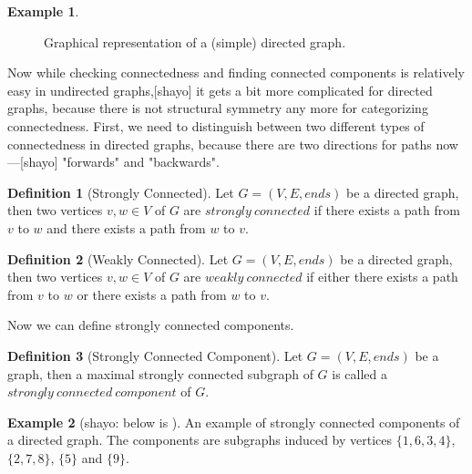 \documentclass{report}
\theoremstyle{plain}
\theoremstyle{definition}
\newtheorem{definition}{Definition}
\newtheorem{example}{Example}
\theoremstyle{remark}
\numberwithin{definition}{chapter}
\numberwithin{example}{chapter}
\numberwithin{figure}{chapter}
\begin{document}
{{\begin{example}
\begin{figure}[h]
\center
{}
\caption{Graphical representation of a (simple) directed graph.}
\end{figure}
\end{example}

Now while checking connectedness and finding connected components is relatively easy in undirected graphs,[shayo] it gets a bit more complicated for directed graphs, because there is not structural symmetry any more for categorizing connectedness. First, we need to distinguish between two different types of connectedness in directed graphs, because there are two directions for paths now ---[shayo] "forwards" and "backwards".

\begin{definition}[Strongly Connected]
Let $G = (V, E, ends)$ be a directed graph, then two vertices $v, w \in V$ of $G$ are $strongly \ connected$ if there exists a path from $v$ to $w$ and there exists a path from $w$ to $v$.
\end{definition}

\begin{definition}[Weakly Connected]
Let $G = (V, E, ends)$ be a directed graph, then two vertices $v, w \in V$ of $G$ are $weakly \ connected$ if either there exists a path from $v$ to $w$ or there exists a path from $w$ to $v$.
\end{definition}

Now we can define strongly connected components.

\begin{definition}[Strongly Connected Component]
Let $G = (V, E, ends)$ be a graph, then a maximal strongly connected subgraph of $G$ is called a $strongly \ connected \ component$ of $G$.
\end{definition}

\begin{example}
[shayo: below is ] An example of strongly connected components of a directed graph. The components are subgraphs induced by vertices $\{1,6,3,4\}$, $\{2,7,8\}$, $\{5\}$ and $\{9\}$.


\end{example}}}
\end{document}
